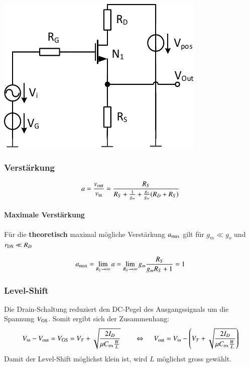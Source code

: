\begin{minipage}[t]{0.4\columnwidth}
    \includegraphics[width=\columnwidth, align=t]{images/03_drain_schaltung.pdf}
\end{minipage}
\hfill
\begin{minipage}[t]{0.58\columnwidth}
    \subsubsection{Verstärkung}

    \vspace{-0.2cm}
    \[
        a = \frac{v_{\rm out}}{v_{\rm in}} = \frac{R_S}{R_S + \frac{1}{g_m} + \frac{g_o}{g_m} (R_D + R_S)}
    \]

    \paragraph{Maximale Verstärkung}

    Für die \textbf{theoretisch} maximal mögliche Verstärkung $a_{\rm max}$ gilt für
    $g_m \ll g_o$ und $r_{\rm DS} \ll R_D$

    \vspace{-0.2cm}

    \[
        a_{\rm max} = \lim_{R_S \to \infty} a = \lim_{R_S \to \infty} g_m \frac{R_S}{g_m R_S + 1} = 1
    \]
\end{minipage}


\subsubsection{Level-Shift}
Die Drain-Schaltung reduziert den DC-Pegel des Ausgangssignals um die Spannung $V_{\rm GS}$. Somit ergibt sich der Zusammenhang:
\[
    V_{\rm in} - V_{\rm out} =  V_{\rm GS} = V_T + \sqrt{\frac{2 I_D}{\mu C_{\rm ox} \frac{W}{L}}} \qquad \Leftrightarrow\ \quad  V_{\rm out} = V_{\rm in} - \left( V_T + \sqrt{\frac{2 I_D}{\mu C_{\rm ox} \frac{W}{L}}} \right)
\]
Damit der Level-Shift möglichst klein ist, wird $L$ möglichst gross gewählt.


